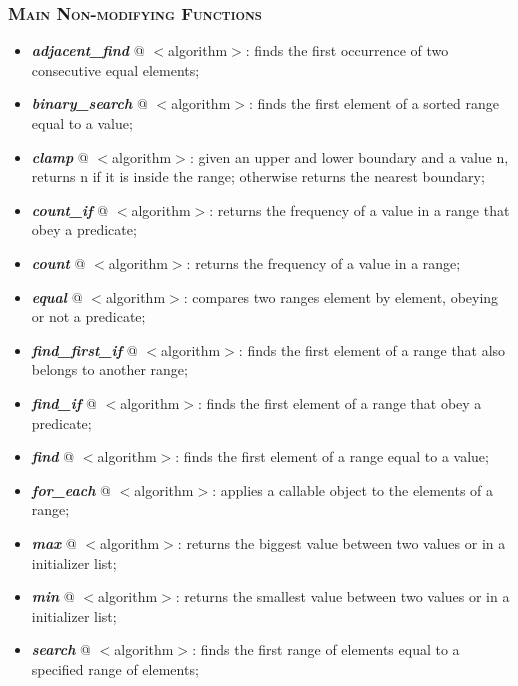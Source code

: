 \documentclass[10pt]{article}
\begin{document}
\begin{multicols*}{5}
{\subsubsection*{\textsc{Main Non-modifying Functions}} 
\begin{itemize}[leftmargin=*,topsep=0.25pt]
  \setlength\itemsep{-1.8pt}
	\item  \emph{\textbf{adjacent\_find}} @ $<$algorithm$>$: finds the first occurrence of two consecutive equal elements;
	\item  \emph{\textbf{binary\_search}} @ $<$algorithm$>$: finds the first element of a sorted range equal to a value;  
	\item  \emph{\textbf{clamp}} @ $<$algorithm$>$: given an upper and lower boundary and a value n, returns n if it is inside the range; otherwise returns the nearest boundary;  
	\item  \emph{\textbf{count\_if}} @ $<$algorithm$>$: returns the frequency of a value in a range that obey a predicate;
	\item  \emph{\textbf{count}} @ $<$algorithm$>$: returns the frequency of a value in a range; 
	\item  \emph{\textbf{equal}} @ $<$algorithm$>$: compares two ranges element by element, obeying or not a predicate;  
	\item  \emph{\textbf{find\_first\_if}} @ $<$algorithm$>$: finds the first element of a range that also belongs to another range;  
	\item  \emph{\textbf{find\_if}} @ $<$algorithm$>$: finds the first element of a range that obey a predicate;
	\item  \emph{\textbf{find}} @ $<$algorithm$>$: finds the first element of a range equal to a value; 
	\item  \emph{\textbf{for\_each}} @ $<$algorithm$>$: applies a callable object to the elements of a range;
	\item  \emph{\textbf{max}} @ $<$algorithm$>$: returns the biggest value between two values or in a initializer list;  
	\item  \emph{\textbf{min}} @ $<$algorithm$>$: returns the smallest value between two values or in a initializer list;  
	\item  \emph{\textbf{search}} @ $<$algorithm$>$: finds the first range of elements equal to a specified range of elements;  
\end{itemize}

}
\end{multicols*}
\end{document}
